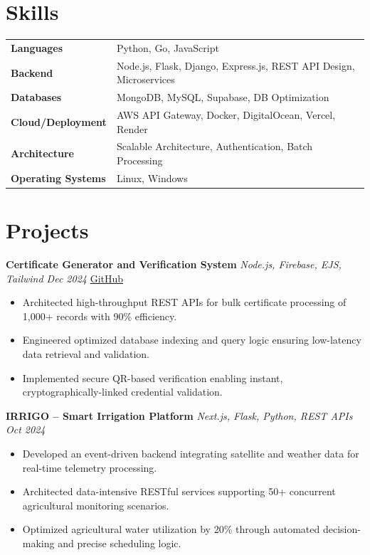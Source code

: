 \documentclass[10pt, a4paper]{article}
\begin{document}
\section*{Skills}

\renewcommand{\arraystretch}{1.0}
\begin{tabular}{@{} >{\bfseries}p{3.8cm} p{13cm} @{}}
Languages           & Python, Go, JavaScript \\
Backend             & Node.js, Flask, Django, Express.js, REST API Design, Microservices \\
Databases           & MongoDB, MySQL, Supabase, DB Optimization \\
Cloud/Deployment    & AWS API Gateway, Docker, DigitalOcean, Vercel, Render \\
Architecture        & Scalable Architecture, Authentication, Batch Processing \\
Operating Systems   & Linux, Windows \\
\end{tabular}

\section*{Projects}

\textbf{Certificate Generator and Verification System} \hfill \textit{Node.js, Firebase, EJS, Tailwind \quad Dec 2024} \quad \href{https://github.com/bbinxx/advanced-certificate-generator}{GitHub}
\begin{itemize}
\item Architected high-throughput REST APIs for bulk certificate processing of 1,000+ records with 90\% efficiency.
\item Engineered optimized database indexing and query logic ensuring low-latency data retrieval and validation.
\item Implemented secure QR-based verification enabling instant, cryptographically-linked credential validation.
\end{itemize}

\vspace{2pt}

\textbf{IRRIGO -- Smart Irrigation Platform} \hfill \textit{Next.js, Flask, Python, REST APIs \quad Oct 2024}
\begin{itemize}
\item Developed an event-driven backend integrating satellite and weather data for real-time telemetry processing.
\item Architected data-intensive RESTful services supporting 50+ concurrent agricultural monitoring scenarios.
\item Optimized agricultural water utilization by 20\% through automated decision-making and precise scheduling logic.
\end{itemize}
\end{document}
